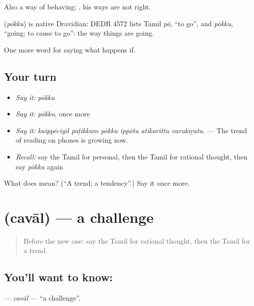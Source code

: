 Also a way of behaving:   , his ways are not right.

\begin{cousinweb}
\textbf{} (\emph{pōkku}) is native Dravidian: DEDR 4572 lists Tamil \emph{pō}, \textquotedblleft{}to go\textquotedblright{}, and \emph{pōkku}, \textquotedblleft{}going; to cause to go\textquotedblright{}: the way things are going.
\end{cousinweb}

\begin{grammarlens}[title={What you've built}]
One more word for saying what happens if.
\end{grammarlens}

\subsection*{Your turn}
\begin{itemize}
\raggedright
  \item \emph{Say it:} \emph{pōkku}
  \item \emph{Say it:} \emph{pōkku}, once more
  \item \emph{Say it:} \emph{kaippēciyil paṭikkum pōkku ippōtu atikarittu varukiṟatu.} — The trend of reading on phones is growing now.
  \item \emph{Recall:} say the Tamil for personal, then the Tamil for rational thought, then say \emph{pōkku} again
\end{itemize}

\begin{tcolorbox}[breakable,colback=teal!4,colframe=teal!35!black,title={Before you move on}]
What does  mean? (\textquotedblleft{}A trend; a tendency\textquotedblright{}.) Say it once more.
\end{tcolorbox}
\section[\texorpdfstring{\ta{சவால்} (cavāl)}{சவால் (cavāl)}]{ (cavāl) — a challenge}

\label{lesson:TA-C398-caval}



\begin{quote}
Before the new one: say the Tamil for rational thought, then the Tamil for a trend.
\end{quote}

\subsection*{You'll want to know: }
\textbf{} — \emph{cavāl} — \textquotedblleft{}a challenge\textquotedblright{}.

